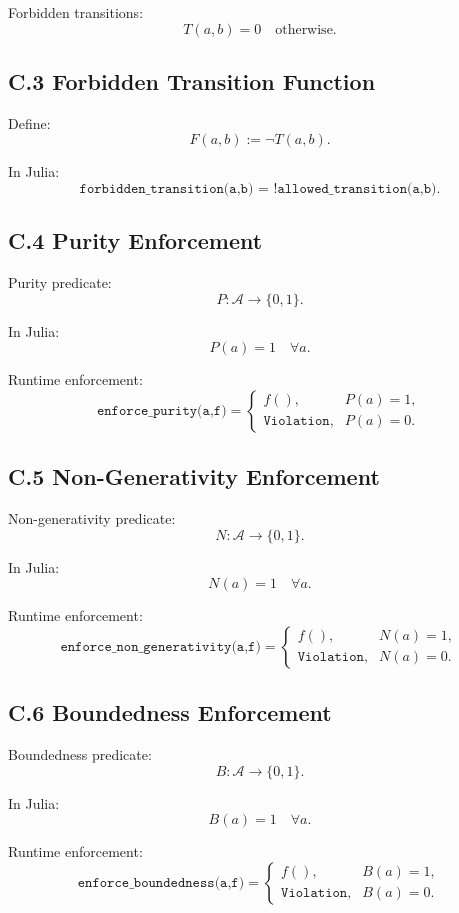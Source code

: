 Forbidden transitions:
\[
T(a,b)=0 \quad \text{otherwise}.
\]

\subsection*{C.3 Forbidden Transition Function}

Define:
\[
F(a,b) := \neg T(a,b).
\]

In Julia:
\[
\texttt{forbidden\_transition(a,b) = !allowed\_transition(a,b)}.
\]

\subsection*{C.4 Purity Enforcement}

Purity predicate:
\[
P : \mathcal{A} \to \{0,1\}.
\]

In Julia:
\[
P(a) = 1 \quad \forall a.
\]

Runtime enforcement:
\[
\texttt{enforce\_purity(a,f)} =
\begin{cases}
f(), & P(a)=1, \\
\texttt{Violation}, & P(a)=0.
\end{cases}
\]

\subsection*{C.5 Non-Generativity Enforcement}

Non-generativity predicate:
\[
N : \mathcal{A} \to \{0,1\}.
\]

In Julia:
\[
N(a)=1 \quad \forall a.
\]

Runtime enforcement:
\[
\texttt{enforce\_non\_generativity(a,f)} =
\begin{cases}
f(), & N(a)=1, \\
\texttt{Violation}, & N(a)=0.
\end{cases}
\]

\subsection*{C.6 Boundedness Enforcement}

Boundedness predicate:
\[
B : \mathcal{A} \to \{0,1\}.
\]

In Julia:
\[
B(a)=1 \quad \forall a.
\]

Runtime enforcement:
\[
\texttt{enforce\_boundedness(a,f)} =
\begin{cases}
f(), & B(a)=1, \\
\texttt{Violation}, & B(a)=0.
\end{cases}
\]

